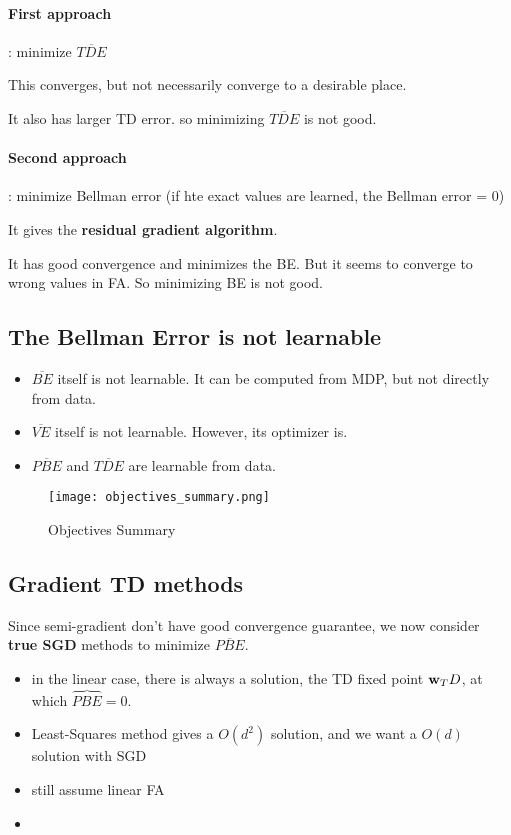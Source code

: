 \documentclass[sutton_barto_notes.tex]{subfiles}
\begin{document}
\paragraph{First approach}: minimize $\overline{TDE}$

This converges, but not necessarily converge to a desirable place.

It also has larger TD error. so minimizing $\overline{TDE}$ is not good.

\paragraph{Second approach}: minimize Bellman error (if hte exact values are learned, the Bellman error = 0)

It gives the \textbf{residual gradient algorithm}.

It has good convergence and minimizes the BE. But it seems to converge to wrong values in FA. So minimizing BE is not good.

\subsection{The Bellman Error is not learnable}

\begin{itemize}
\item $\overline{BE}$ itself is not learnable. It can be computed from MDP, but not directly from data.
\item $\overline{VE}$ itself is not learnable. However, its optimizer is.
\item $\overline{PBE}$ and $\overline{TDE}$ are learnable from data.
\end{itemize}

\begin{figure}[h!]
    \centering
    \texttt{[image: objectives\_summary.png]}
    \caption{ Objectives Summary }
\end{figure}

\newpage
\subsection{Gradient TD methods}

Since semi-gradient don't have good convergence guarantee, we now consider \textbf{true SGD} methods to minimize $\overline{PBE}$.

\begin{itemize}
\item in the linear case, there is always a solution, the TD fixed point ${\operatorname*{\mathbf{w}}}_TD$, at which $\overbrace{PBE} = 0$.
\item Least-Squares method gives a $O(d^2)$ solution, and we want a $O(d)$ solution with SGD
\item still assume linear FA
\item 
\end{itemize}
\end{document}
